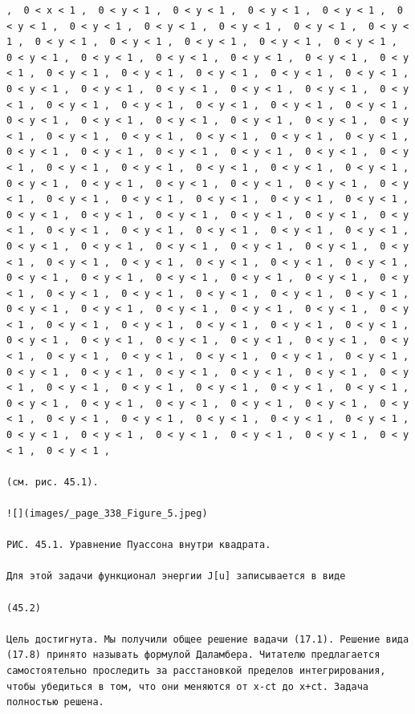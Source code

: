 \documentclass[
  ukrainian,
]{article}
\begin{document}
\begin{verbatim}
,  0 < x < 1 ,  0 < y < 1 ,  0 < y < 1 ,  0 < y < 1 ,  0 < y < 1 ,  0 < y < 1 ,  0 < y < 1 ,  0 < y < 1 ,  0 < y < 1 ,  0 < y < 1 ,  0 < y < 1 ,  0 < y < 1 ,  0 < y < 1 ,  0 < y < 1 ,  0 < y < 1 ,  0 < y < 1 ,  0 < y < 1 ,  0 < y < 1 ,  0 < y < 1 ,  0 < y < 1 ,  0 < y < 1 ,  0 < y < 1 ,  0 < y < 1 ,  0 < y < 1 ,  0 < y < 1 ,  0 < y < 1 ,  0 < y < 1 ,  0 < y < 1 ,  0 < y < 1 ,  0 < y < 1 ,  0 < y < 1 ,  0 < y < 1 ,  0 < y < 1 ,  0 < y < 1 ,  0 < y < 1 ,  0 < y < 1 ,  0 < y < 1 ,  0 < y < 1 ,  0 < y < 1 ,  0 < y < 1 ,  0 < y < 1 ,  0 < y < 1 ,  0 < y < 1 ,  0 < y < 1 ,  0 < y < 1 ,  0 < y < 1 ,  0 < y < 1 ,  0 < y < 1 ,  0 < y < 1 ,  0 < y < 1 ,  0 < y < 1 ,  0 < y < 1 ,  0 < y < 1 ,  0 < y < 1 ,  0 < y < 1 ,  0 < y < 1 ,  0 < y < 1 ,  0 < y < 1 ,  0 < y < 1 ,  0 < y < 1 ,  0 < y < 1 ,  0 < y < 1 ,  0 < y < 1 ,  0 < y < 1 ,  0 < y < 1 ,  0 < y < 1 ,  0 < y < 1 ,  0 < y < 1 ,  0 < y < 1 ,  0 < y < 1 ,  0 < y < 1 ,  0 < y < 1 ,  0 < y < 1 ,  0 < y < 1 ,  0 < y < 1 ,  0 < y < 1 ,  0 < y < 1 ,  0 < y < 1 ,  0 < y < 1 ,  0 < y < 1 ,  0 < y < 1 ,  0 < y < 1 ,  0 < y < 1 ,  0 < y < 1 ,  0 < y < 1 ,  0 < y < 1 ,  0 < y < 1 ,  0 < y < 1 ,  0 < y < 1 ,  0 < y < 1 ,  0 < y < 1 ,  0 < y < 1 ,  0 < y < 1 ,  0 < y < 1 ,  0 < y < 1 ,  0 < y < 1 ,  0 < y < 1 ,  0 < y < 1 ,  0 < y < 1 ,  0 < y < 1 ,  0 < y < 1 ,  0 < y < 1 ,  0 < y < 1 ,  0 < y < 1 ,  0 < y < 1 ,  0 < y < 1 ,  0 < y < 1 ,  0 < y < 1 ,  0 < y < 1 ,  0 < y < 1 ,  0 < y < 1 ,  0 < y < 1 ,  0 < y < 1 ,  0 < y < 1 ,  0 < y < 1 ,  0 < y < 1 ,  0 < y < 1 ,  0 < y < 1 ,  0 < y < 1 ,  0 < y < 1 ,  0 < y < 1 ,  0 < y < 1 ,  0 < y < 1 ,  0 < y < 1 ,  0 < y < 1 ,  0 < y < 1 ,  0 < y < 1 ,  0 < y < 1 ,  0 < y < 1 ,  0 < y < 1 ,  0 < y < 1 ,  0 < y < 1 ,  0 < y < 1 ,  0 < y < 1 ,  0 < y < 1 ,  0 < y < 1 ,  0 < y < 1 ,  0 < y < 1 ,  0 < y < 1 ,  0 < y < 1 ,  0 < y < 1 ,  0 < y < 1 ,  0 < y < 1 ,  0 < y < 1 ,  0 < y < 1 ,  0 < y < 1 ,  0 < y < 1 ,  0 < y < 1 ,  0 < y < 1 ,  0 < y < 1 ,  0 < y < 1 ,  0 < y < 1 ,  0 < y < 1 ,  0 < y < 1 ,  0 < y < 1 ,

(см. рис. 45.1).

![](images/_page_338_Figure_5.jpeg)

РИС. 45.1. Уравнение Пуассона внутри квадрата.

Для этой задачи функционал энергии J[u] записывается в виде

(45.2)

Цель достигнута. Мы получили общее решение вадачи (17.1). Решение вида (17.8) принято называть формулой Даламбера. Читателю предлагается самостоятельно проследить за расстановкой пределов интегрирования, чтобы убедиться в том, что они меняются от x-ct до x+ct. Задача полностью решена.


\end{verbatim}
\end{document}
